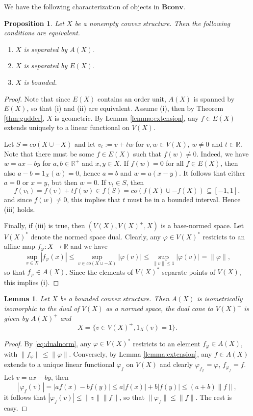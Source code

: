 \documentclass[12pt]{article}
\newtheorem{lemma}{Lemma}
\newtheorem{prop}{Proposition}
\newcommand{\<}{\langle}
\newcommand{\ct}[1]{\mathbf{#1}}
\begin{document}
We have the following characterization of objects in $\ct{Bconv}$.
\begin{prop}\label{prop:bounded} Let $X$ be a nonempty convex structure. Then the following conditions  are equivalent.
\begin{enumerate}
\item[(i)] $X$ is separated by $A(X)$.
\item[(ii)] $X$ is separated by $E(X)$.
\item[(iii)] $X$ is bounded.
\end{enumerate}

\end{prop}


\begin{proof} Note that since $E(X)$ contains an order unit, $A(X)$ is spanned by $E(X)$, so that (i) and (ii) are equivalent. Assume 
(i), then by Theorem \ref{thm:gudder}, $X$ is geometric. By Lemma \ref{lemma:extension}, any $f\in E(X)$ extends uniquely to a linear functional on $V(X)$. 

Let $S=co(X\cup -X)$ and let $v_t:=v+tw$ for $v,w\in V(X)$, $w\ne 0$ and $t\in \mathbb R$. 
Note that there must be some $f\in E(X)$ such that $f(w)\ne0$. Indeed, we have $w=ax-by$ for $a,b\in \mathbb R^+$ and $x,y\in X$. If $f(w)=0$ for all $f\in E(X)$, 
 then also $a-b=1_X(w)=0$, hence $a=b$ and $w=a(x-y)$. It follows that either $a=0$ or $x=y$, but then $w=0$. If $v_t\in S$, 
  then 
  \[
  f(v_t)=f(v)+tf(w)\in f(S)=co(f(X)\cup -f(X))\subseteq [-1,1],
  \]
   and since $f(w)\ne 0$, this implies that $t$ must be in a bounded interval. Hence (iii) holds. 

Finally, if (iii) is true, then $(V(X), V(X)^+, X)$ is a base-normed space. Let $V(X)^*$ denote the normed space dual. 
Clearly, any $\varphi\in V(X)^*$ restricts to an affine map 
$f_\varphi:X\to \mathbb R$ and  we have
\begin{equation}\label{eq:dualnorm}
\sup_{x\in X} |f_\varphi(x)|\le \sup_{v\in co(X\cup -X)}|\varphi(v)|\le \sup_{\|v\|\le 1}|\varphi(v)|=\|\varphi\|,
\end{equation}
so that $f_\varphi\in A(X)$. Since the elements of $V(X)^*$ separate points of $V(X)$, this implies (i).


\end{proof}


\begin{lemma} Let $X$ be a bounded convex structure. Then  $A(X)$ is isometrically isomorphic to the dual of $V(X)$ as a normed space,  the dual cone to $V(X)^+$ is given by $A(X)^+$ and 
\[
X=\{v\in V(X)^+, 1_X(v)=1\}.
\]
\end{lemma}

\begin{proof} By \eqref{eq:dualnorm}, any $\varphi\in V(X)^*$ restricts to an  element  
 $f_\varphi\in A(X)$, with $\|f_\varphi\|\le \|\varphi\|$.  Conversely, by Lemma \ref{lemma:extension}, any $f\in A(X)$ extends to a unique linear functional $\varphi_f$ on $V(X)$
and clearly $\varphi_{f_\varphi}=\varphi$, $f_{\varphi_f}=f$. Let $v=ax-by$, then
\[
|\varphi_f(v)|=|af(x)-bf(y)|\le a|f(x)|+b|f(y)|\le (a+b)\|f\|,
\]
it follows that $|\varphi_f(v)|\le \|v\|\|f\|$, so that $\|\varphi_f\|\le \|f\|$. The rest is easy.


\end{proof}
\end{document}
